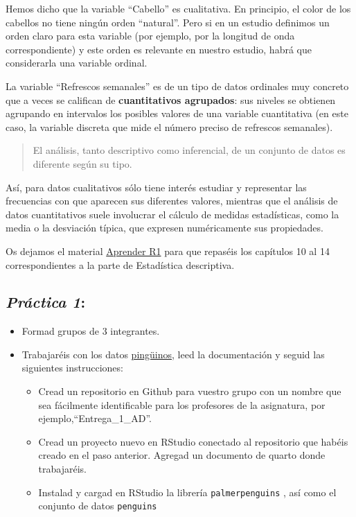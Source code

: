 \documentclass[
  letterpaper,
  DIV=11,
  numbers=noendperiod]{scrreprt}
\begin{document}

Hemos dicho que la variable ``Cabello'' es cualitativa. En principio, el
color de los cabellos no tiene ningún orden ``natural''. Pero si en un
estudio definimos un orden claro para esta variable (por ejemplo, por la
longitud de onda correspondiente) y este orden es relevante en nuestro
estudio, habrá que considerarla una variable ordinal.


La variable ``Refrescos semanales'' es de un tipo de datos ordinales muy
concreto que a veces se califican de \textbf{cuantitativos agrupados}:
sus niveles se obtienen agrupando en intervalos los posibles valores de
una variable cuantitativa (en este caso, la variable discreta que mide
el número preciso de refrescos semanales). 

\begin{quote}
El análisis, tanto descriptivo como inferencial, de un conjunto de datos
es diferente según su tipo.
\end{quote}

Así, para datos cualitativos sólo tiene interés estudiar y representar
las frecuencias con que aparecen sus diferentes valores, mientras que el
análisis de datos cuantitativos suele involucrar el cálculo de medidas
estadísticas, como la media o la desviación típica, que expresen
numéricamente sus propiedades.

Os dejamos el material
\href{https://aprender-uib.github.io/AprendeR1/}{Aprender R1} para que
repaséis los capítulos 10 al 14 correspondientes a la parte de
Estadística descriptiva.

\hypertarget{pruxe1ctica-1}{%
\subsection{\texorpdfstring{{\emph{Práctica
1}}:}{Práctica 1:}}\label{pruxe1ctica-1}}

\begin{itemize}
\item
  Formad grupos de 3 integrantes.
\item
  Trabajaréis con los datos
  \href{https://allisonhorst.github.io/palmerpenguins/}{pingüinos}, leed
  la documentación y seguid las siguientes instrucciones:

  \begin{itemize}
  \item
    Cread un repositorio en Github para vuestro grupo con un nombre que
    sea fácilmente identificable para los profesores de la asignatura,
    por ejemplo,``Entrega\_1\_AD''.
  \item
    Cread un proyecto nuevo en RStudio conectado al repositorio que
    habéis creado en el paso anterior. Agregad un documento de quarto
    donde trabajaréis.
  \item
    Instalad y cargad en RStudio la librería \texttt{palmerpenguins} ,
    así como el conjunto de datos \texttt{penguins}
  \end{itemize}
\end{itemize}
\end{document}
